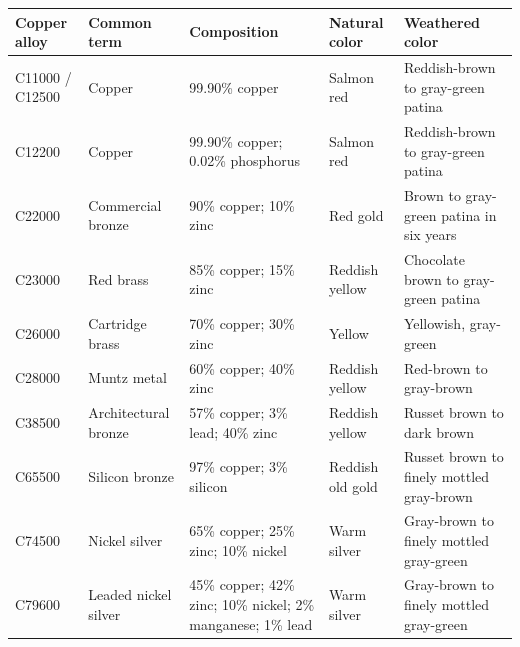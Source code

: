 \documentclass{article}
\begin{document}
\begin{tabular}{lllll}
\toprule
Copper alloy & Common term & Composition & Natural color & Weathered color \\
\midrule
C11000 / C12500 & Copper & 99.90\% copper & Salmon red & Reddish-brown to gray-green patina \\
C12200 & Copper & 99.90\% copper; 0.02\% phosphorus & Salmon red & Reddish-brown to gray-green patina \\
C22000 & Commercial bronze & 90\% copper; 10\% zinc & Red gold & Brown to gray-green patina in six years \\
C23000 & Red brass & 85\% copper; 15\% zinc & Reddish yellow & Chocolate brown to gray-green patina \\
C26000 & Cartridge brass & 70\% copper; 30\% zinc & Yellow & Yellowish, gray-green \\
C28000 & Muntz metal & 60\% copper; 40\% zinc & Reddish yellow & Red-brown to gray-brown \\
C38500 & Architectural bronze & 57\% copper; 3\% lead; 40\% zinc & Reddish yellow & Russet brown to dark brown \\
C65500 & Silicon bronze & 97\% copper; 3\% silicon & Reddish old gold & Russet brown to finely mottled gray-brown \\
C74500 & Nickel silver & 65\% copper; 25\% zinc; 10\% nickel & Warm silver & Gray-brown to finely mottled gray-green \\
C79600 & Leaded nickel silver & 45\% copper; 42\% zinc; 10\% nickel; 2\% manganese; 1\% lead & Warm silver & Gray-brown to finely mottled gray-green \\
\bottomrule
\end{tabular}
\end{document}
